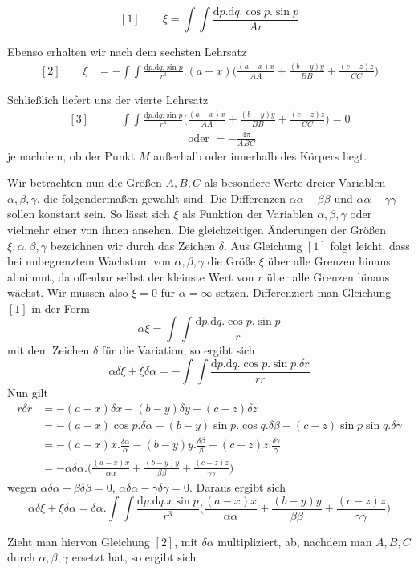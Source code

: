 \[
[1]\qquad \xi=\int\!\int\frac{\mathrm{d}p.\mathrm{d}q.\cos p.\sin p}{Ar}
\]
\par
Ebenso erhalten wir nach dem sechsten Lehrsatz
\[
\begin{aligned}
[2]\qquad \xi&=-\int\!\int\frac{\mathrm{d}p.\mathrm{d}q.\sin p}{r^3}.(a-x)\bigl(\frac{(a-x)x}{AA}+\frac{(b-y)y}{BB}+\frac{(c-z)z}{CC}\bigr)
\end{aligned}
\]
\par
Schließlich liefert uns der vierte Lehrsatz
\[
\begin{aligned}
[3]\qquad &\int\!\int\frac{\mathrm{d}p.\mathrm{d}q.\sin p}{r^3}\bigl(\frac{(a-x)x}{AA}+\frac{(b-y)y}{BB}+\frac{(c-z)z}{CC}\bigr)=0\\
&\hspace{6em}\text{oder }=-\frac{4\pi}{ABC}
\end{aligned}
\]
je nachdem, ob der Punkt $M$ außerhalb oder innerhalb des Körpers liegt.

Wir betrachten nun die Größen $A,B,C$ als besondere Werte dreier Variablen $\alpha,\beta,\gamma$, die folgendermaßen gewählt sind. Die Differenzen $\alpha\alpha-\beta\beta$ und $\alpha\alpha-\gamma\gamma$ sollen konstant sein. So lässt sich $\xi$ als Funktion der Variablen $\alpha,\beta,\gamma$ oder vielmehr einer von ihnen ansehen. Die gleichzeitigen Änderungen der Größen $\xi,\alpha,\beta,\gamma$ bezeichnen wir durch das Zeichen $\delta$. Aus Gleichung $[1]$ folgt leicht, dass bei unbegrenztem Wachstum von $\alpha,\beta,\gamma$ die Größe $\xi$ über alle Grenzen hinaus abnimmt, da offenbar selbst der kleinste Wert von $r$ über alle Grenzen hinaus wächst. Wir müssen also $\xi=0$ für $\alpha=\infty$ setzen. Differenziert man Gleichung $[1]$ in der Form
\[
\alpha\xi=\int\!\int\frac{\mathrm{d}p.\mathrm{d}q.\cos p.\sin p}{r}
\]
mit dem Zeichen $\delta$ für die Variation, so ergibt sich
\[
\alpha\delta\xi+\xi\delta\alpha=-\int\!\int\frac{\mathrm{d}p.\mathrm{d}q.\cos p.\sin p.\delta r}{rr}
\]
Nun gilt
\[
\begin{aligned}
r\delta r&=-(a-x)\delta x-(b-y)\delta y-(c-z)\delta z\\
&=-(a-x)\cos p.\delta\alpha-(b-y)\sin p.\cos q.\delta\beta-(c-z)\sin p\sin q.\delta\gamma\\
&=-(a-x)x.\frac{\delta\alpha}{\alpha}-(b-y)y.\frac{\delta\beta}{\beta}-(c-z)z.\frac{\delta\gamma}{\gamma}\\
&=-\alpha\delta\alpha.\bigl(\frac{(a-x)x}{\alpha\alpha}+\frac{(b-y)y}{\beta\beta}+\frac{(c-z)z}{\gamma\gamma}\bigr)
\end{aligned}
\]
wegen $\alpha\delta\alpha-\beta\delta\beta=0$, $\alpha\delta\alpha-\gamma\delta\gamma=0$. Daraus ergibt sich
\[
\alpha\delta\xi+\xi\delta\alpha=\delta\alpha.\int\!\int\frac{\mathrm{d}p.\mathrm{d}q.x\sin p}{r^3}\bigl(\frac{(a-x)x}{\alpha\alpha}+\frac{(b-y)y}{\beta\beta}+\frac{(c-z)z}{\gamma\gamma}\bigr)
\]
\par
Zieht man hiervon Gleichung $[2]$, mit $\delta\alpha$ multipliziert, ab, nachdem man $A,B,C$ durch $\alpha,\beta,\gamma$ ersetzt hat, so ergibt sich
